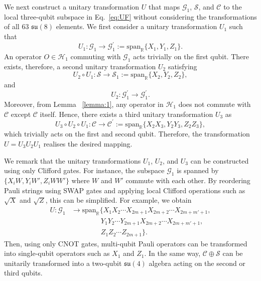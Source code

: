 \documentclass[aps,showpacs,amsmath,amssymb,twocolumn,prx,longbibliography,superscriptaddress,notitlepage,floatfix,10pt]{revtex4-2}
\begin{document}
We next construct a unitary transformation $U$ that maps
$\mathcal G_{1}$, $\mathcal S$, and $\mathcal C$
to the local three-qubit subspace in Eq.~\eqref{eq:UF} without considering the transformations of all 63 $\mathfrak{su}(8)$ elements. We first consider a unitary transformation $U_{1}$ such that
\begin{equation}
    U_{1}:\mathcal{G}_{1}\rightarrow\mathcal{G}_{1}^{\prime}:=\mathrm{span}_{\mathbb{R}}\{X_{1},Y_{1},Z_{1}\}.
\end{equation}
An operator $O\in\mathcal{H}_{1}$ commuting with $\mathcal{G}_{1}$ acts trivially on the first qubit. There exists, therefore, a second unitary transformation $U_{2}$ satisfying
\begin{equation}
U_{2}\circ U_{1}:\mathcal{S}\rightarrow\mathcal{S}_{1}:=\mathrm{span}_{\mathbb{R}}\{X_{2},Y_{2},Z_{2}\},      \end{equation}
and
\begin{equation}
U_2:\mathcal{G}_{1}^{\prime}\rightarrow\mathcal{G}_{1}^{\prime}    .
\end{equation}
 Moreover, from Lemma ~\ref{lemma:1}, any operator in $\mathcal{H}_{1}$ does not commute with $\mathcal{C}$ except $\mathcal{C}$ itself. Hence, there exists a third unitary transformation $U_{3}$ as
 \begin{equation}
U_{3}\circ U_{2}\circ U_{1}:\mathcal{C}\rightarrow\mathcal{C}^{\prime}:=\mathrm{span}_{\mathbb{R}}\{X_{2}X_{3},Y_{2}Y_{3},Z_{2}Z_{3}\},
\end{equation}
which trivially acts on the first and second qubit. Therefore, the transformation $U=U_{3}U_{2}U_{1}$ realises the desired mapping. 

We remark that the unitary transformations $U_{1}$, $U_{2}$, and $U_{3}$ can be constructed using only Clifford gates. For instance, the subspace $\mathcal{G}_{1}$ is spanned by $\{X_{i}W,Y_{i}W',Z_{i}WW'\}$ where $W$ and $W'$ commute with each other. By reordering Pauli strings using SWAP gates and applying local Clifford operations such as $\sqrt{X}$ and $\sqrt{Z}$, this can be simplified. For example, we obtain
\begin{equation}
\begin{split}
    U:\mathcal{G}_{1}
    &\rightarrow
        \mathrm{span}_{\mathbb{R}}
        \bigl\{
            X_{1}X_{2}\cdots X_{2m+1}X_{2m+2}\cdots X_{2m+m'+1},\\
            &\quad\quad\quad\quad~ Y_{1}Y_{2}\cdots Y_{2m+1}X_{2m+2}\cdots X_{2m+m'+1},\\
            &\quad\quad\quad\quad~ Z_{1}Z_{2}\cdots Z_{2m+1}
        \bigr\}.
\end{split}
\end{equation}
Then, using only CNOT gates, multi-qubit Pauli operators can be transformed into single-qubit operators such as $X_{1}$ and $Z_{1}$.
In the same way, $\mathcal{C}\oplus\mathcal{S}$ can be unitarily transformed into a two-qubit $\mathfrak{su}(4)$ algebra acting on the second or third qubits.
\end{document}
